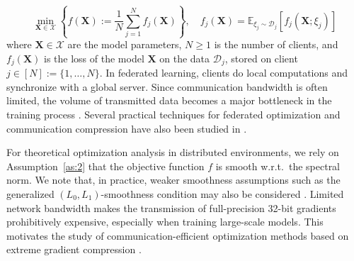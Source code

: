 \documentclass{article}
\begin{document}
\begin{equation}
\min_{\mathbf{X} \in \mathcal{X}} \left\{ f(\mathbf{X}) := \frac{1}{N}\sum_{j=1}^N f_j(\mathbf{X})\right\}, \quad f_j(\mathbf{X})=\mathbb{E}_{\xi_j\sim\mathcal{D}_j}[f_j(\mathbf{X};\xi_j)]
\label{fed_eq}
\end{equation}
where $\mathbf{X} \in \mathcal{X}$ are the model parameters, $N \ge 1$ is the number of clients, and $f_j(\mathbf{X})$ is the loss of the model $\mathbf{X}$ on the data $\mathcal{D}_j$, stored on client $j \in [N] := \{1, \dots, N\}$. In federated learning, clients do local computations and synchronize with a global server. Since communication bandwidth is often limited, the volume of transmitted data becomes a major bottleneck in the training process \cite{bernstein2019signsgdmajority, horvath2023stochastic}. Several practical techniques for federated optimization and communication compression have also been studied in \cite{beznosikov2020biased, gruntkowska2025error, ahn2025dion}.

For theoretical optimization analysis in distributed environments, we rely on Assumption~\ref{as:2} that the objective function $f$ is smooth w.r.t.\ the spectral norm. 
We note that, in practice, weaker smoothness assumptions such as the generalized $(L_0,L_1)$-smoothness condition may also be considered \cite{pethick2025generalized}. 
Limited network bandwidth makes the transmission of full-precision 32-bit gradients prohibitively expensive, especially when training large-scale models. This motivates the study of communication-efficient optimization methods based on extreme gradient compression \cite{bernstein2018signsgd, bernstein2019signsgdmajority, beznosikov2020biased}.
\end{document}
